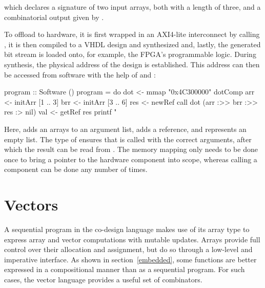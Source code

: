 \documentclass[../paper.tex]{subfiles}
\begin{document}


\noindent which declares a signature of two input arrays, both with a length of three, and a combinatorial output given by .

To offload  to hardware, it is first wrapped in an AXI4-lite interconnect by calling , it is then compiled to a VHDL design and synthesized and, lastly, the generated bit stream is loaded onto, for example, the FPGA's programmable logic. During synthesis, the physical address of the design is established. This address can then be accessed from software with the help of  and :

\begin{code}
program :: Software ()
program = do
  dot <- mmap "0x4C300000" dotComp
  arr <- initArr [1 .. 3]
  brr <- initArr [3 .. 6]
  res <- newRef
  call dot (arr :>> brr :>> res :> nil)
  val <- getRef res
  printf "%
\end{code}

\noindent Here, \codei{(:>>)} adds an arrays to an argument list, \codei{(:>)} adds a reference, and  represents an empty list. The type of  ensures that  is called with the correct arguments, after which the result can be read from . The memory mapping only needs to be done once to bring a pointer to the hardware component into scope, whereas calling a component can be done any number of times.

\section{Vectors}
\label{vectors}

A sequential program in the co-design language makes use of its array type to express array and vector computations with mutable updates. Arrays provide full control over their allocation and assignment, but do so through a low-level and imperative interface. As shown in section~\ref{embedded}, some functions are better expressed in a compositional manner than as a sequential program. For such cases, the vector language provides a useful set of combinators.
\end{document}
